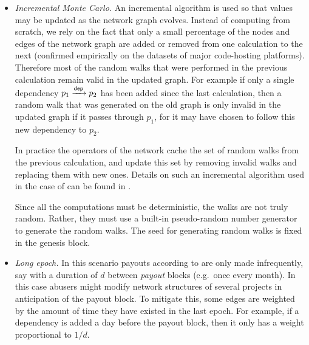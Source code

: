 \begin{itemize}
\item \emph{Incremental Monte Carlo.} An incremental algorithm is used so that
  \osrank{} values may be updated as the network graph evolves. Instead of
  computing \osrank{} from scratch, we rely on the fact that only a small
  percentage of the nodes and edges of the network graph are added or removed
  from one calculation to the next (confirmed empirically on the datasets of
  major code-hosting platforms). Therefore most of the random walks that were
  performed in the previous calculation remain valid in the updated graph. For
  example if only a single dependency $p_1 \xrightarrow[]{\mathsf{dep}} p_2$ has been
  added since the last calculation, then a random walk that was generated on the
  old graph is only invalid in the updated graph if it passes through $p_1$, for
  it may have chosen to follow this new dependency to $p_2$.

  In practice the operators of the network cache the set of random
  walks from the previous calculation, and update this set by removing
  invalid walks and replacing them with new ones. Details on such an
  incremental algorithm used in the case of \pagerank{} can be found
  in \cite{incr pagerank}.

  Since all the computations must be deterministic, the walks are not
  truly random. Rather, they must use a built-in pseudo-random number
  generator to generate the random walks. The seed for generating
  random walks is fixed in the genesis block.


\item \emph{Long epoch.} In this scenario payouts according to
  \osrank{} are only made infrequently, say with a duration of $d$
  between \emph{payout} blocks (e.g.\ once every month). In this case
  abusers might modify network structures of several projects in
  anticipation of the payout block. To mitigate this, some edges are
  weighted by the amount of time they have existed in the last epoch. For
  example, if a dependency is added a day before the payout block,
  then it only has a weight proportional to $1/d$.
\end{itemize}

